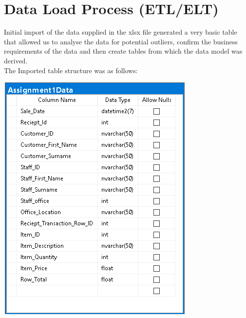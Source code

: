 \documentclass{article}
\begin{document}
    \section{Data Load Process (ETL/ELT)}
        Initial import of the data supplied in the xlsx file generated a very basic table
        that allowed us to analyse the data for potential outliers, confirm the business
        requirements of the data and then create tables from which the data model was derived.
        \\
        The Imported table structure was as follows:
        \begin{center}
            \includegraphics{Images/Initial_Import.png}
        \end{center}

        \newpage
\end{document}
